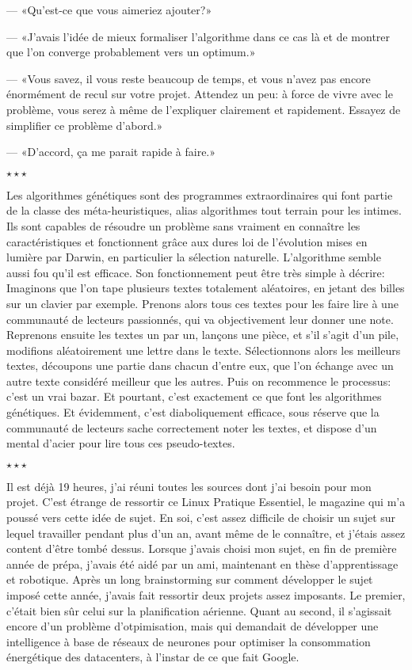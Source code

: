 \documentclass[letterpaper, 12pt]{report} %
\newcommand{\stardelimiter}{{\begin{center}\vspace{0.3cm} $\star \star \star$\vspace{0.25cm}\end{center}}}
\begin{document}
{--- «Qu'est-ce que vous aimeriez ajouter?»

--- «J'avais l'idée de mieux formaliser l'algorithme dans ce cas là et de montrer que l'on converge probablement vers un optimum.»

--- «Vous savez, il vous reste beaucoup de temps, et vous n'avez pas encore énormément de recul sur votre projet.
		Attendez un peu: à force de vivre avec le problème, vous serez à même de l'expliquer clairement et rapidement.
		Essayez de simplifier ce problème d'abord.»

--- «D'accord, ça me parait rapide à faire.»

\stardelimiter{}

Les algorithmes génétiques sont des programmes extraordinaires qui font partie de la classe des méta-heuristiques, alias algorithmes tout terrain pour les intimes. 
Ils sont capables de résoudre un problème sans vraiment en connaître les caractéristiques et fonctionnent grâce aux dures loi de l'évolution mises en lumière par Darwin, en particulier la sélection naturelle. 
L'algorithme semble aussi fou qu'il est efficace.
Son fonctionnement peut être très simple à décrire: 
Imaginons que l'on tape plusieurs textes totalement aléatoires, en jetant des billes sur un clavier par exemple.
Prenons alors tous ces textes pour les faire lire à une communauté de lecteurs passionnés, qui va objectivement leur donner une note.
Reprenons ensuite les textes un par un, lançons une pièce, et s'il s'agit d'un pile, modifions aléatoirement une lettre dans le texte.
Sélectionnons alors les meilleurs textes, découpons une partie dans chacun d'entre eux, que l'on échange avec un autre texte considéré meilleur que les autres.
Puis on recommence le processus: c'est un vrai bazar. 
Et pourtant, c'est exactement ce que font les algorithmes génétiques.
Et évidemment, c'est diaboliquement efficace, sous réserve que la communauté de lecteurs sache correctement noter les textes, et dispose d'un mental d'acier pour lire tous ces pseudo-textes.

\stardelimiter{}

Il est déjà 19 heures, j'ai réuni toutes les sources dont j'ai besoin pour mon projet. 
C'est étrange de ressortir ce Linux Pratique Essentiel, le magazine qui m'a poussé vers cette idée de sujet. 
En soi, c'est assez difficile de choisir un sujet sur lequel travailler pendant plus d'un an, avant même de le connaître,
et j'étais assez content d'être tombé dessus.
Lorsque j'avais choisi mon sujet, en fin de première année de prépa, j'avais été aidé par un ami, maintenant en thèse d'apprentissage et robotique.
Après un long brainstorming sur comment développer le sujet imposé cette année, j'avais fait ressortir deux projets assez imposants.
Le premier, c'était bien sûr celui sur la planification aérienne. 
Quant au second, il s'agissait encore d'un problème d'otpimisation, mais qui demandait de développer une intelligence à base de réseaux de neurones pour optimiser la consommation énergétique des datacenters, à l'instar de ce que fait Google.

}
\end{document}
